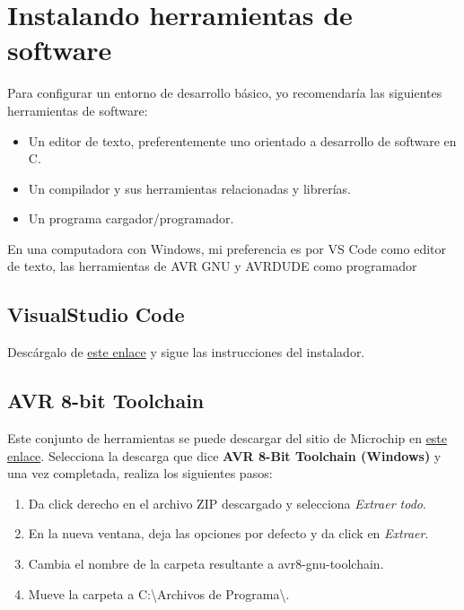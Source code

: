 \documentclass[10pt,letterpaper]{article}
\begin{document}
\section{Instalando herramientas de software}
Para configurar un entorno de desarrollo básico, yo recomendaría las siguientes herramientas de software:
\begin{itemize}
    \item Un editor de texto, preferentemente uno orientado a desarrollo de software en C.
    \item Un compilador y sus herramientas relacionadas y librerías.
    \item Un programa cargador/programador.
\end{itemize}
En una computadora con Windows, mi preferencia es por VS Code como editor de texto, las herramientas de AVR GNU y AVRDUDE como programador

\subsection{VisualStudio Code}
Descárgalo de \href{https://code.visualstudio.com/Download}{este enlace} y sigue las instrucciones del instalador.

\subsection{AVR 8-bit Toolchain}
Este conjunto de herramientas se puede descargar del sitio de Microchip en \href{https://www.microchip.com/en-us/tools-resources/develop/microchip-studio/gcc-compilers}{este enlace}. Selecciona la descarga que dice \textbf{AVR 8-Bit Toolchain (Windows)} y una vez completada, realiza los siguientes pasos:
\begin{enumerate}
    \item Da click derecho en el archivo ZIP descargado y selecciona \textit{Extraer todo}.
    \item En la nueva ventana, deja las opciones por defecto y da click en \textit{Extraer}.
    \item Cambia el nombre de la carpeta resultante a {\color{ForestGreen}avr8-gnu-toolchain}. 
    \item Mueve la carpeta a {\color{ForestGreen}C:\textbackslash Archivos de Programa\textbackslash}.
\end{enumerate}
\end{document}
